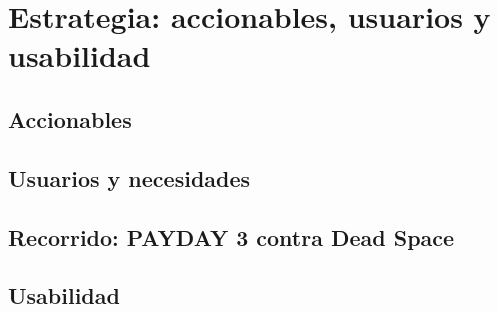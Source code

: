 \section{Estrategia: accionables, usuarios y usabilidad}\label{sec:estrategia}

\subsection{Accionables}

\subsection{Usuarios y necesidades}

\subsection{Recorrido: PAYDAY 3 contra Dead Space}

\subsection{Usabilidad}
